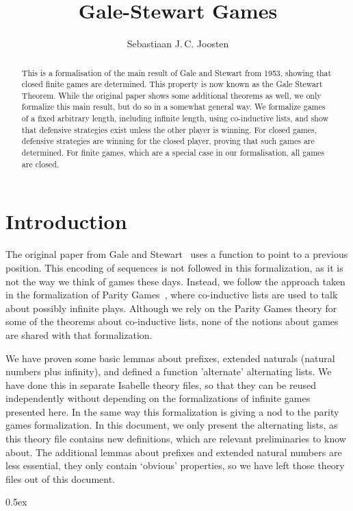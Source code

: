 \documentclass[11pt,a4paper]{article}
\begin{document}
\title{Gale-Stewart Games}
\author{Sebastiaan J.\,C. Joosten}
\maketitle

\begin{abstract}
  This is a formalisation of the main result of Gale and Stewart from 1953, showing that closed finite games are determined.
  This property is now known as the Gale Stewart Theorem.
  While the original paper shows some additional theorems as well, we only formalize this main result, but do so in a somewhat general way.
  We formalize games of a fixed arbitrary length, including infinite length, using co-inductive lists, and show that defensive strategies exist unless the other player is winning.
  For closed games, defensive strategies are winning for the closed player, proving that such games are determined.
  For finite games, which are a special case in our formalisation, all games are closed.
\end{abstract}

\tableofcontents

\section{Introduction}
The original paper from Gale and Stewart~\cite{GS53} uses a function to point to a previous position.
This encoding of sequences is not followed in this formalization, as it is not the way we think of games these days.
Instead, we follow the approach taken in the formalization of Parity Games~\cite{Parity_Game-AFP}, where co-inductive lists are used to talk about possibly infinite plays.
Although we rely on the Parity Games theory for some of the theorems about co-inductive lists, none of the notions about games are shared with that formalization.

We have proven some basic lemmas about prefixes, extended naturals (natural numbers plus infinity), and defined a function 'alternate' alternating lists.
We have done this in separate Isabelle theory files, so that they can be reused independently without depending on the formalizations of infinite games presented here.
In the same way this formalization is giving a nod to the parity games formalization.
In this document, we only present the alternating lists, as this theory file contains new definitions, which are relevant preliminaries to know about.
The additional lemmas about prefixes and extended natural numbers are less essential, they only contain `obvious' properties, so we have left those theory files out of this document.


\parindent 0pt\parskip 0.5ex





\end{document}
